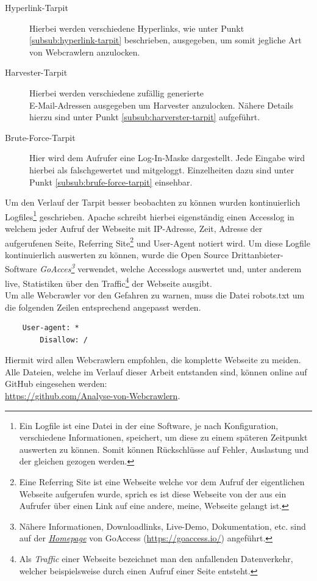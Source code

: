 \begin{description}
	\item[Hyperlink-Tarpit] Hierbei werden verschiedene Hyperlinks, wie unter Punkt \ref{subsub:hyperlink-tarpit} beschrieben, ausgegeben, um somit jegliche Art von Webcrawlern anzulocken.
	\item[Harvester-Tarpit] Hierbei werden verschiedene zufällig generierte\\E-Mail-Adressen ausgegeben um Harvester anzulocken. Nähere Details hierzu sind unter Punkt \ref{subsub:harverster-tarpit} aufgeführt.
	\item[Brute-Force-Tarpit] Hier wird dem Aufrufer eine Log-In-Maske dargestellt. Jede Eingabe wird hierbei als \glqq falsch\grqq\space gewertet und mitgeloggt. Einzelheiten dazu sind unter Punkt \ref{subsub:brufe-force-tarpit} einsehbar.
\end{description}
Um den Verlauf der Tarpit besser beobachten zu können wurden kontinuierlich Logfiles\footnote{Ein Logfile ist eine Datei in der eine Software, je nach Konfiguration, verschiedene Informationen, speichert, um diese zu einem späteren Zeitpunkt auswerten zu können. Somit können Rückschlüsse auf Fehler, Auslastung und der gleichen gezogen werden.} geschrieben. Apache schreibt hierbei eigenständig einen Accesslog in welchem jeder Aufruf der Webseite mit IP-Adresse, Zeit, Adresse der aufgerufenen Seite, Referring Site\footnote{Eine Referring Site ist eine Webseite welche vor dem Aufruf der eigentlichen Webseite aufgerufen wurde, sprich es ist diese Webseite von der aus ein Aufrufer über einen Link auf eine andere, \glqq meine\grqq, Webseite gelangt ist.} und User-Agent notiert wird. Um diese Logfile kontinuierlich auswerten zu können, wurde die Open Source Drittanbieter-Software \emph{GoAcces\footnote{Nähere Informationen, Downloadlinks, Live-Demo, Dokumentation, etc. sind auf der \href{https://goaccess.io/}{\emph{Homepage}} von GoAccess (\url{https://goaccess.io/}) angeführt.}} verwendet, welche Accesslogs auswertet und, unter anderem live, Statistiken über den Traffic\footnote{Als \emph{Traffic} einer Webseite bezeichnet man den anfallenden Datenverkehr, welcher beispielsweise durch einen Aufruf einer Seite entsteht.} der Webseite ausgibt.\\
Um alle Webcrawler vor den Gefahren zu warnen, muss die Datei robots.txt um die folgenden Zeilen entsprechend angepasst werden.
\begin{lstlisting}
	User-agent: *
		Disallow: /
\end{lstlisting}
Hiermit wird allen Webcrawlern empfohlen, die komplette Webseite zu meiden.\\
Alle Dateien, welche im Verlauf dieser Arbeit entstanden sind, können online auf GitHub eingesehen werden:\\\url{https://github.com/Analyse-von-Webcrawlern}.
\label{umsetzung_grundlegendes}